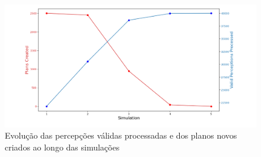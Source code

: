 \begin{figure}
    \centering
    \includegraphics[width=\textwidth]{Images/perceptions_vs_plans.png}
    \caption{Evolução das percepções válidas processadas e dos planos novos criados ao longo das simulações}
    \label{fig:perceptions_v_plans-experiment3}
\end{figure}